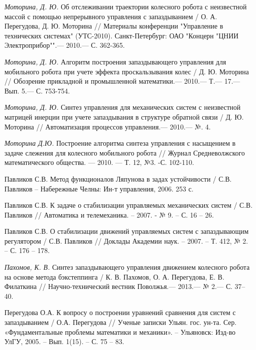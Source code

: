 \begin{thebibliography}{10}
	{\it Моторина, Д. Ю.} Об отслеживании траектории колесного робота с неизвестной массой с помощью непрерывного управления с запаздыванием / О. А. Перегудова, Д. Ю. Моторина // Материалы конференции "Управление в технических системах" (УТС-2010). Санкт-Петербург: ОАО "Концерн "ЦНИИ Электроприбор"".—  2010.— С. 362-365.
	
	{\it Моторина, Д. Ю.} Алгоритм построения запаздывающего управления для мобильного робота при учете эффекта проскальзывания колес / Д. Ю. Моторина // Обозрение прикладной и промышленной математики.—  2010.— Т.— 17.— Вып. 5.— С. 753-754.
	
	{\it Моторина, Д. Ю.} Синтез управления для механических систем с неизвестной матрицей инерции при учете запаздывания в структуре обратной связи / Д. Ю. Моторина // Автоматизация процессов управления.—  2010.— №. 4.
	
	{\it Моторина Д.Ю.} Построение алгоритма синтеза управления с насыщением в задаче слежения для колесного мобильного робота // Журнал Средневолжского математического общества. — 2010. — Т. 12, №3. -С. 102-110.
	
	Павликов С.В. Метод функционалов Ляпунова в задах устойчивости / С.В. Павликов – Набережные Челны: Ин-т управления, 2006. 253 с.
	
	Павликов С.В. К задаче о стабилизации управляемых механических систем / С.В. Павликов // Автоматика и телемеханика. – 2007. - № 9. – С. 16 – 26.
	
	Павликов С.В. О стабилизации движений управляемых систем с запаздывающим регулятором / С.В. Павликов // Доклады Академии наук. – 2007. – Т. 412, № 2. – С. 176 – 178.
	
	{\it Пахомов, К. В.} Синтез запаздывающего управления движением колесного робота на основе метода бэкстеппинга /
	К. В. Пахомов, О. А. Перегудова, Е. В. Филаткина // Научно-технический вестник Поволжья.— 2013.— № 2.— С. 37–40.
	
	Перегудова О.А. К вопросу о построении уравнений сравнения для систем с запаздыванием / О.А. Перегудова // Ученые записки Ульян. гос. ун-та. Сер. «Фундаментальные проблемы математики и механики». – Ульяновск: Изд-во УлГУ, 2005. – Вып. 1(15). – С. 75 – 83.
	

\end{thebibliography}
